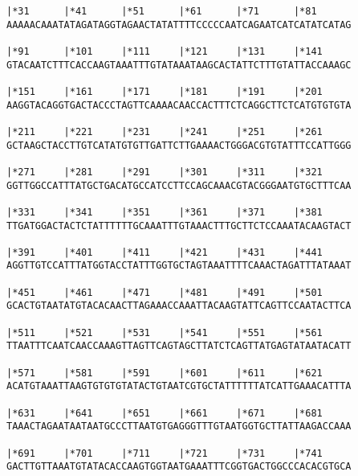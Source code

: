 \documentclass{article}
\begin{document}
\begin{Verbatim}
|*31      |*41      |*51      |*61      |*71      |*81      
AAAAACAAATATAGATAGGTAGAACTATATTTTCCCCCAATCAGAATCATCATATCATAG
                                                            
|*91      |*101     |*111     |*121     |*131     |*141     
GTACAATCTTTCACCAAGTAAATTTGTATAAATAAGCACTATTCTTTGTATTACCAAAGC
                                                            
|*151     |*161     |*171     |*181     |*191     |*201     
AAGGTACAGGTGACTACCCTAGTTCAAAACAACCACTTTCTCAGGCTTCTCATGTGTGTA
                                                            
|*211     |*221     |*231     |*241     |*251     |*261     
GCTAAGCTACCTTGTCATATGTGTTGATTCTTGAAAACTGGGACGTGTATTTCCATTGGG
                                                            
|*271     |*281     |*291     |*301     |*311     |*321     
GGTTGGCCATTTATGCTGACATGCCATCCTTCCAGCAAACGTACGGGAATGTGCTTTCAA
                                                            
|*331     |*341     |*351     |*361     |*371     |*381     
TTGATGGACTACTCTATTTTTTGCAAATTTGTAAACTTTGCTTCTCCAAATACAAGTACT
                                                            
|*391     |*401     |*411     |*421     |*431     |*441     
AGGTTGTCCATTTATGGTACCTATTTGGTGCTAGTAAATTTTCAAACTAGATTTATAAAT
                                                            
|*451     |*461     |*471     |*481     |*491     |*501     
GCACTGTAATATGTACACAACTTAGAAACCAAATTACAAGTATTCAGTTCCAATACTTCA
                                                            
|*511     |*521     |*531     |*541     |*551     |*561     
TTAATTTCAATCAACCAAAGTTAGTTCAGTAGCTTATCTCAGTTATGAGTATAATACATT
                                                            
|*571     |*581     |*591     |*601     |*611     |*621     
ACATGTAAATTAAGTGTGTGTATACTGTAATCGTGCTATTTTTTATCATTGAAACATTTA
                                                            
|*631     |*641     |*651     |*661     |*671     |*681     
TAAACTAGAATAATAATGCCCTTAATGTGAGGGTTTGTAATGGTGCTTATTAAGACCAAA
                                                            
|*691     |*701     |*711     |*721     |*731     |*741     
GACTTGTTAAATGTATACACCAAGTGGTAATGAAATTTCGGTGACTGGCCCACACGTGCA
                                                            

\end{Verbatim}
\end{document}
